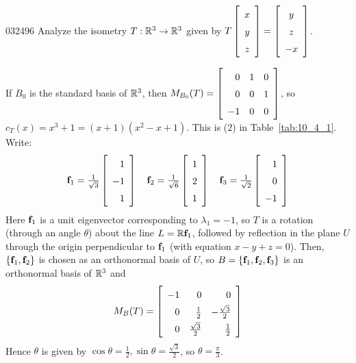 \begin{example}{}{032496}
Analyze the isometry $T : \mathbb{R}^3 \to \mathbb{R}^3$ given by $T
\leftB \begin{array}{c}
x \\
y \\
z
\end{array} \rightB
=
\leftB \begin{array}{c}
y \\
z \\
-x
\end{array} \rightB$.

\begin{solution}
If $B_{0}$ is the standard basis of $\mathbb{R}^3$, then $M_{B_0}(T) = 
\leftB \begin{array}{rrr}
0 & 1 & 0 \\
0 & 0 & 1 \\
-1 & 0 & 0
\end{array} \rightB$, so $c_{T}(x) = x^{3} + 1 = (x + 1)(x^{2} - x + 1)$. This is (2) in Table~\ref{tab:10_4_1}. Write:
\begin{equation*}
\vect{f}_1 = \frac{1}{\sqrt{3}}
\leftB \begin{array}{r}
1 \\
-1 \\
1
\end{array} \rightB
\quad \vect{f}_2 = \frac{1}{\sqrt{6}}
\leftB \begin{array}{rr}
1 \\
2 \\
1
\end{array} \rightB
\quad \vect{f}_3 = \frac{1}{\sqrt{2}}
\leftB \begin{array}{rr}
1 \\
0 \\
-1
\end{array} \rightB
\end{equation*}
Here $\textbf{f}_{1}$ is a unit eigenvector corresponding to $\lambda_{1} = -1$, so $T$ is a rotation (through an angle $\theta$) about the line $L = \mathbb{R}\textbf{f}_{1}$, followed by reflection in the plane $U$ through the origin perpendicular to $\textbf{f}_{1}$ (with equation $x - y + z = 0$). Then, $\{\textbf{f}_{1}, \textbf{f}_{2}\}$ is chosen as an orthonormal basis of $U$, so $B = \{\textbf{f}_{1}, \textbf{f}_{2}, \textbf{f}_{3}\}$ is an orthonormal basis of $\mathbb{R}^3$ and
\begin{equation*}
\def\arraystretch{1.5}
M_B(T) = 
\leftB \begin{array}{rrr}
-1 & 0 & 0 \\
 0 & \frac{1}{2} & - \frac{\sqrt{3}}{2} \\
 0 & \frac{\sqrt{3}}{2} & \frac{1}{2} 
\end{array} \rightB
\end{equation*}
Hence $\theta$ is given by $\cos \theta = \frac{1}{2}, \sin \theta = \frac{\sqrt{3}}{2}$, so $\theta = \frac{\pi}{3}$.
\end{solution}
\end{example}

